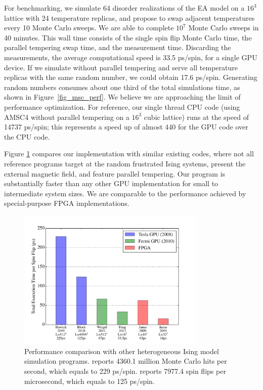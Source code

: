 For benchmarking, we simulate 64 disorder realizations of the
EA model on a $16^3$ lattice with 24 temperature
replicas, and propose to swap adjacent temperatures every 10 Monte
Carlo sweeps.  We are able to complete $10^7$ Monte Carlo sweeps in 40 minutes. 
This wall time consists of the single spin flip Monte Carlo time,
the parallel tempering swap time, and the measurement time.
Discarding the measurements, the average computational speed is 33.5
ps/spin, for a single GPU device.
If we simulate without parallel tempering and serve all
temperature replicas with the same random number, we could obtain 17.6
ps/spin.  Generating random numbers consumes about one third of the
total simulations time, as shown in Figure~\ref{fig_msc_perf}.  We
believe we are approaching the limit of performance optimization. For
reference, our single thread CPU code (using AMSC4 without parallel tempering on a $16^3$ cubic lattice) runs at the speed of 14737
ps/spin; this represents a speed up of almost 440 for the GPU code over
the CPU code.

Figure \ref{fig_perf} compares our implementation with similar
existing codes, where not all reference programs target at the
random frustrated Ising systems, present the external magnetic field, and feature parallel tempering.
Our program is substantially faster than any other GPU implementation
\cite{CSTN-093,2010CoPhC.181.1549B,doi:10.1142/S0129183112400025,Weigel:2012:PPS:2151219.2151631} for
small to intermediate system sizes. We are comparable to the
performance achieved by special-purpose FPGA
implementations\cite{2012arXiv1204.4134J}.


\begin{figure}[!ht]
  \centering
  \includegraphics[width=0.8\textwidth]{img/compare.pdf}
  \caption{Performance comparison with other heterogeneous Ising model simulation programs.
\citet{CSTN-093} reports 4360.1 million Monte Carlo hits per second,
which equals to 229 ps/spin.
\citet{2010CoPhC.181.1549B} reports 7977.4 spin flips per microsecond,
which equals to 125 ps/spin.
}
  \label{fig_perf}
\end{figure}
 



